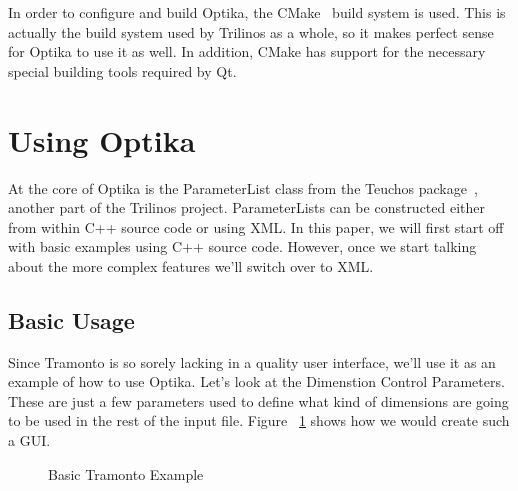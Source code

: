 In order to configure and build Optika, the CMake~\cite{cmake} build system is used. This is actually the build system
used by Trilinos as a whole, so it makes perfect sense for Optika to use it as well. In addition, CMake
has support for the necessary special building tools required by Qt.

\section{Using Optika}
At the core of Optika is the ParameterList class from the Teuchos package~\cite{TeuchosPackage}, another part
of the Trilinos project. ParameterLists can be constructed either from within C++ source code or using XML.
In this paper, we will first start off with basic examples using C++ source code. However, once we start
talking about the more complex features we'll switch over to XML.
\subsection{Basic Usage}
Since Tramonto is so sorely lacking in a quality user interface, we'll use it as an example of how to use Optika.
Let's look at the Dimenstion Control Parameters. These are just a few parameters used to define what kind of
dimensions are going to be used in the rest of the input file. Figure ~\ref{basicTramonto} shows how we would create
such a GUI.

\begin{figure}
\centering

\label{basicTramonto}
\caption{Basic Tramonto Example}
\end{figure}

